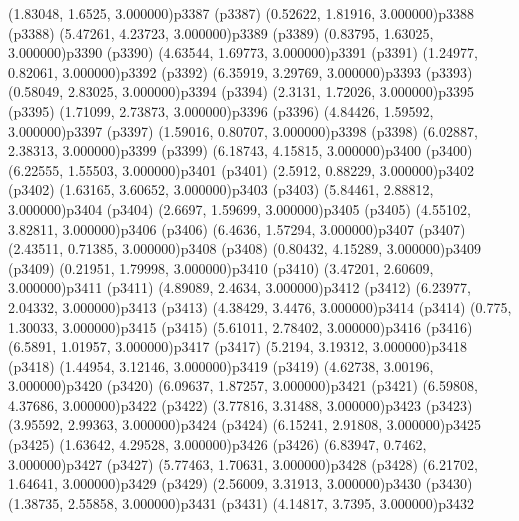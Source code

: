 \psPoint(1.83048, 1.6525, 3.000000){p3387}
\psdot(p3387)
\psPoint(0.52622, 1.81916, 3.000000){p3388}
\psdot(p3388)
\psPoint(5.47261, 4.23723, 3.000000){p3389}
\psdot(p3389)
\psPoint(0.83795, 1.63025, 3.000000){p3390}
\psdot(p3390)
\psPoint(4.63544, 1.69773, 3.000000){p3391}
\psdot(p3391)
\psPoint(1.24977, 0.82061, 3.000000){p3392}
\psdot(p3392)
\psPoint(6.35919, 3.29769, 3.000000){p3393}
\psdot(p3393)
\psPoint(0.58049, 2.83025, 3.000000){p3394}
\psdot(p3394)
\psPoint(2.3131, 1.72026, 3.000000){p3395}
\psdot(p3395)
\psPoint(1.71099, 2.73873, 3.000000){p3396}
\psdot(p3396)
\psPoint(4.84426, 1.59592, 3.000000){p3397}
\psdot(p3397)
\psPoint(1.59016, 0.80707, 3.000000){p3398}
\psdot(p3398)
\psPoint(6.02887, 2.38313, 3.000000){p3399}
\psdot(p3399)
\psPoint(6.18743, 4.15815, 3.000000){p3400}
\psdot(p3400)
\psPoint(6.22555, 1.55503, 3.000000){p3401}
\psdot(p3401)
\psPoint(2.5912, 0.88229, 3.000000){p3402}
\psdot(p3402)
\psPoint(1.63165, 3.60652, 3.000000){p3403}
\psdot(p3403)
\psPoint(5.84461, 2.88812, 3.000000){p3404}
\psdot(p3404)
\psPoint(2.6697, 1.59699, 3.000000){p3405}
\psdot(p3405)
\psPoint(4.55102, 3.82811, 3.000000){p3406}
\psdot(p3406)
\psPoint(6.4636, 1.57294, 3.000000){p3407}
\psdot(p3407)
\psPoint(2.43511, 0.71385, 3.000000){p3408}
\psdot(p3408)
\psPoint(0.80432, 4.15289, 3.000000){p3409}
\psdot(p3409)
\psPoint(0.21951, 1.79998, 3.000000){p3410}
\psdot(p3410)
\psPoint(3.47201, 2.60609, 3.000000){p3411}
\psdot(p3411)
\psPoint(4.89089, 2.4634, 3.000000){p3412}
\psdot(p3412)
\psPoint(6.23977, 2.04332, 3.000000){p3413}
\psdot(p3413)
\psPoint(4.38429, 3.4476, 3.000000){p3414}
\psdot(p3414)
\psPoint(0.775, 1.30033, 3.000000){p3415}
\psdot(p3415)
\psPoint(5.61011, 2.78402, 3.000000){p3416}
\psdot(p3416)
\psPoint(6.5891, 1.01957, 3.000000){p3417}
\psdot(p3417)
\psPoint(5.2194, 3.19312, 3.000000){p3418}
\psdot(p3418)
\psPoint(1.44954, 3.12146, 3.000000){p3419}
\psdot(p3419)
\psPoint(4.62738, 3.00196, 3.000000){p3420}
\psdot(p3420)
\psPoint(6.09637, 1.87257, 3.000000){p3421}
\psdot(p3421)
\psPoint(6.59808, 4.37686, 3.000000){p3422}
\psdot(p3422)
\psPoint(3.77816, 3.31488, 3.000000){p3423}
\psdot(p3423)
\psPoint(3.95592, 2.99363, 3.000000){p3424}
\psdot(p3424)
\psPoint(6.15241, 2.91808, 3.000000){p3425}
\psdot(p3425)
\psPoint(1.63642, 4.29528, 3.000000){p3426}
\psdot(p3426)
\psPoint(6.83947, 0.7462, 3.000000){p3427}
\psdot(p3427)
\psPoint(5.77463, 1.70631, 3.000000){p3428}
\psdot(p3428)
\psPoint(6.21702, 1.64641, 3.000000){p3429}
\psdot(p3429)
\psPoint(2.56009, 3.31913, 3.000000){p3430}
\psdot(p3430)
\psPoint(1.38735, 2.55858, 3.000000){p3431}
\psdot(p3431)
\psPoint(4.14817, 3.7395, 3.000000){p3432}
